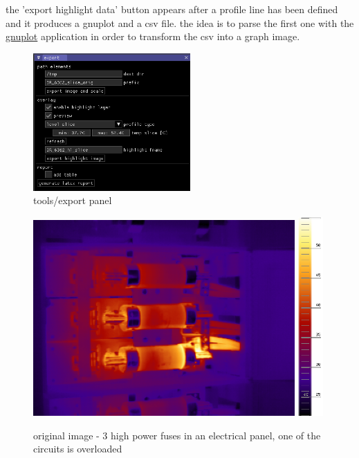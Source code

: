 \documentclass[12pt,twoside,a4paper,notitlepage]{report}
\begin{document}
the 'export highlight data' button appears after a profile line has been defined and it produces a gnuplot and a csv file. the idea is to parse the first one with the \href{http://www.gnuplot.info/}{gnuplot} application in order to transform the csv into a graph image.


\begin{figure}[ht]
 \centering
 \includegraphics[width=6cm, keepaspectratio=true]{img/tools_export_slice}
 \caption{tools/export panel}
 \label{fig:tools-export-overview}
\end{figure}


\begin{figure}[ht]
 \centering
 \includegraphics[width=10cm, keepaspectratio=true]{img/FLIR_P60_orig}
 \includegraphics[width=9.5mm, keepaspectratio=true]{img/FLIR_P60_orig_scale}
 \caption{original image - 3 high power fuses in an electrical panel, one of the circuits is overloaded}
 \label{fig:tools-export-orig-image}
\end{figure}
\end{document}
